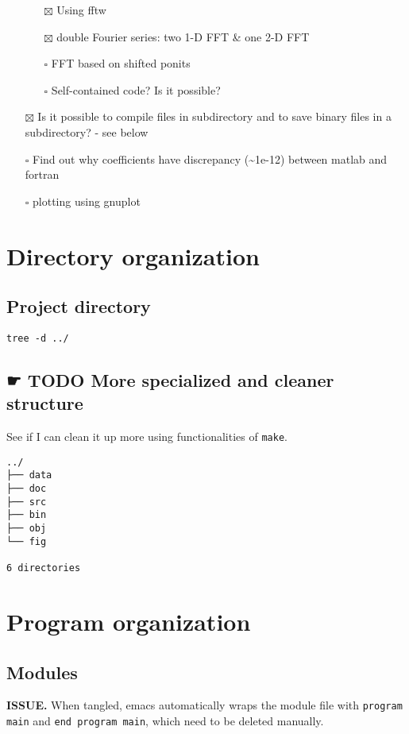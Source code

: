 \documentclass[11pt]{article}
\begin{document}
\begin{itemize}
\begin{itemize}
\item[{$\boxtimes$}] Using fftw
\item[{$\boxtimes$}] double Fourier series: two 1-D FFT \& one 2-D FFT
\item[{$\square$}] FFT based on shifted ponits
\item[{$\square$}] Self-contained code? Is it possible?
\end{itemize}
\item[{$\boxtimes$}] Is it possible to compile files in subdirectory and to save
binary files in a subdirectory? - see below
\item[{$\square$}] Find out why coefficients have discrepancy (\textasciitilde{}1e-12) between matlab and fortran
\item[{$\square$}] plotting using gnuplot
\end{itemize}
\section{Directory organization}
\label{sec:org6d95a01}
\subsection{Project directory}
\label{sec:org46af9f0}
\begin{verbatim}
tree -d ../
\end{verbatim}

\subsection{{\bfseries\sffamily ☛ TODO} More specialized and cleaner structure}
\label{sec:org0e31fc4}
See if I can clean it up more using functionalities of \texttt{make}.
\begin{verbatim}
../
├── data
├── doc
├── src
├── bin
├── obj
└── fig

6 directories
\end{verbatim}
\section{Program organization}
\label{sec:org028dfb7}
\subsection{Modules}
\label{sec:org04d2a7d}
\textbf{ISSUE.} When tangled, emacs automatically wraps the module file with \texttt{program main} and \texttt{end program main}, which need to be deleted manually.
\end{document}
